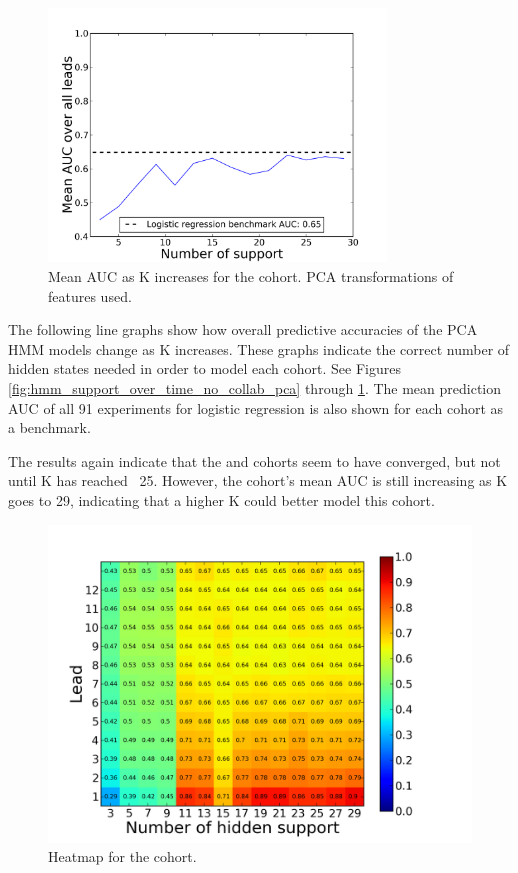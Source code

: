 \begin{figure}[ht!]
  \caption{Mean AUC as K increases for the \both cohort. PCA transformations of features used.}\label{fig:hmm_support_over_time_forum_and_wiki_pca}
  \centering
    \includegraphics[width=0.8\textwidth]{figures/hmm/forum_and_wiki_pca_support_over_time.png}
\end{figure}


The following line graphs show how overall predictive accuracies of the PCA HMM models change as K increases. These graphs indicate the correct number of hidden states needed in order to model each cohort. See Figures \ref{fig:hmm_support_over_time_no_collab_pca} through 
\ref{fig:hmm_support_over_time_forum_and_wiki_pca}. The mean prediction AUC of all 91 experiments for logistic regression is also shown for each cohort as a benchmark.

The results again indicate that the \forum and \both cohorts seem to have converged, but not until K has reached ~25. However, the \neither cohort's mean AUC is still increasing as K goes to 29, indicating that a higher K could better model this cohort.

\begin{figure}[ht!]
  \caption{Heatmap for the \neither cohort.}\label{fig:hmm_heatmap_no_collab}
  \centering
    \includegraphics[width=1.0\textwidth]{figures/hmm/no_collab.png}
\end{figure}

